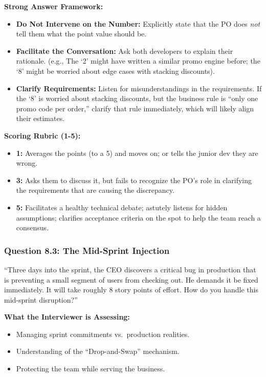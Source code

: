 \textbf{Strong Answer Framework:}

\begin{itemize}
\tightlist
\item
  \textbf{Do Not Intervene on the Number:} Explicitly state that the PO
  does \emph{not} tell them what the point value should be.
\item
  \textbf{Facilitate the Conversation:} Ask both developers to explain
  their rationale. (e.g., The `2' might have written a similar promo
  engine before; the `8' might be worried about edge cases with stacking
  discounts).
\item
  \textbf{Clarify Requirements:} Listen for misunderstandings in the
  requirements. If the `8' is worried about stacking discounts, but the
  business rule is ``only one promo code per order,'' clarify that rule
  immediately, which will likely align their estimates.
\end{itemize}

\textbf{Scoring Rubric (1-5):}

\begin{itemize}
\tightlist
\item
  \textbf{1:} Averages the points (to a 5) and moves on; or tells the
  junior dev they are wrong.
\item
  \textbf{3:} Asks them to discuss it, but fails to recognize the PO's
  role in clarifying the requirements that are causing the discrepancy.
\item
  \textbf{5:} Facilitates a healthy technical debate; astutely listens
  for hidden assumptions; clarifies acceptance criteria on the spot to
  help the team reach a consensus.
\end{itemize}

\subsubsection{Question 8.3: The Mid-Sprint
Injection}\label{question-8.3-the-mid-sprint-injection}

``Three days into the sprint, the CEO discovers a critical bug in
production that is preventing a small segment of users from checking
out. He demands it be fixed immediately. It will take roughly 8 story
points of effort. How do you handle this mid-sprint disruption?''

\textbf{What the Interviewer is Assessing:}

\begin{itemize}
\tightlist
\item
  Managing sprint commitments vs.~production realities.
\item
  Understanding of the ``Drop-and-Swap'' mechanism.
\item
  Protecting the team while serving the business.
\end{itemize}

